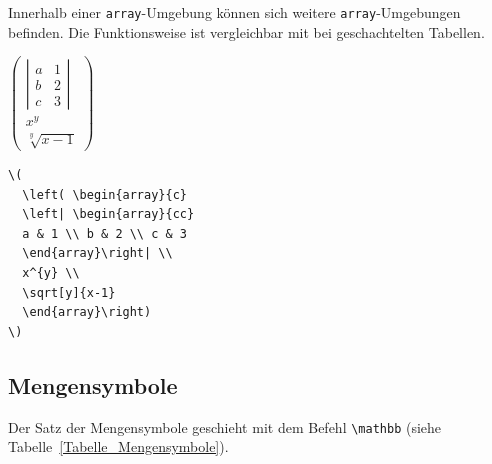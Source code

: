 \documentclass[a4paper,10pt,twoside]{scrbook}
\begin{document}
{Innerhalb einer \verb!array!-Umgebung können sich weitere 
\verb!array!-Umgebungen befinden. Die Funktionsweise ist vergleichbar mit 
bei geschachtelten Tabellen.


\begin{minipage}[c]{.38\textwidth}
\setlength{\parskip}{1em}
\centering
\(
  \left( \begin{array}{c}
  \left| \begin{array}{cc}
  a & 1 \\ b & 2 \\ c & 3 
  \end{array}\right| \\
  x^{y} \\
  \sqrt[y]{x-1}
  \end{array}\right)
\)
\end{minipage}
\hfill
\begin{minipage}[c]{.6\textwidth}
\setlength{\parskip}{1em}
\begin{lstlisting}[label=arraybeispiel2, style=customlatex]
\(
  \left( \begin{array}{c}
  \left| \begin{array}{cc}
  a & 1 \\ b & 2 \\ c & 3 
  \end{array}\right| \\
  x^{y} \\
  \sqrt[y]{x-1}
  \end{array}\right)
\)
\end{lstlisting}
\end{minipage}


\subsection{Mengensymbole}


Der Satz der Mengensymbole geschieht mit dem Befehl \verb!\mathbb!
(siehe Tabelle~\ref{Tabelle_Mengensymbole}).




}
\end{document}
